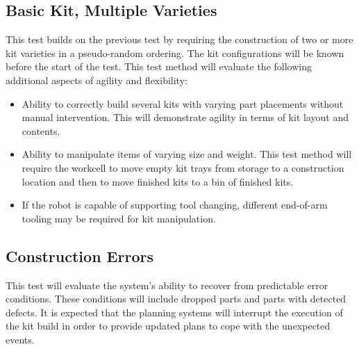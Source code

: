 \subsection{Basic Kit, Multiple Varieties}
This test builds on the previous test by requiring the construction of two or more kit varieties in a pseudo-random ordering.
The kit configurations will be known before the start of the test.
This test method will evaluate the following additional aspects of agility and flexibility:
\begin{itemize}
	\item Ability to correctly build several kits with varying part placements without manual intervention.
	This will demonstrate agility in terms of kit layout and contents.
	\item Ability to manipulate items of varying size and weight. This test method will require the workcell
	to move empty kit trays from storage to a construction location and then to move finished kits to
	a bin of finished kits.
	\item If the robot is capable of supporting tool changing, different end-of-arm tooling may be required for
	kit manipulation.
\end{itemize}

\subsection{Construction Errors}
This test will evaluate the system's ability to recover from predictable error conditions. These conditions will include
dropped parts and parts with detected defects. It is expected that the planning systems will interrupt the
execution of the kit build in order to provide updated plans to cope with the unexpected events. 